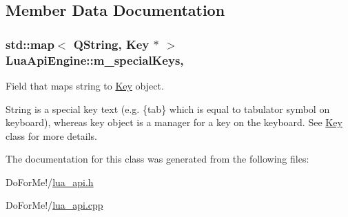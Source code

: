 \subsection{Member Data Documentation}
\hypertarget{class_lua_api_engine_a9fdba2d7f2f8d051453b5d1561435f5e}{
\subsubsection[{m\-\_\-special\-Keys}]{\setlength{\rightskip}{0pt plus 5cm}std\-::map$<$ Q\-String, {\bf Key} $\ast$ $>$ Lua\-Api\-Engine\-::m\-\_\-special\-Keys\hspace{0.3cm}{\ttfamily [static]}, {\ttfamily [private]}}}\label{class_lua_api_engine_a9fdba2d7f2f8d051453b5d1561435f5e}


Field that maps string to \hyperlink{class_key}{Key} object. 

String is a special key text (e.\-g. \{tab\} which is equal to tabulator symbol on keyboard), whereas key object is a manager for a key on the keyboard. See \hyperlink{class_key}{Key} class for more details. 

The documentation for this class was generated from the following files\-:\begin{DoxyCompactItemize}
\item 
Do\-For\-Me!/\hyperlink{lua__api_8h}{lua\-\_\-api.\-h}\item 
Do\-For\-Me!/\hyperlink{lua__api_8cpp}{lua\-\_\-api.\-cpp}\end{DoxyCompactItemize}
